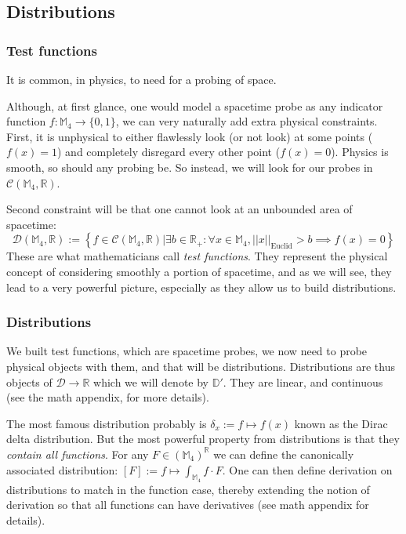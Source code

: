 \documentclass[a4paper,11pt]{article}
\numberwithin{equation}{section}
\theoremstyle{definition}
\begin{document}
\subsection{Distributions}\label{DistribPhy}
\subsubsection{Test functions}
    It is common, in physics, to need for a probing of space.
    
    Although, at first glance, one would model a spacetime probe as any indicator function $f:\mathbb{M}_4 \to \{0,1\}$, we can very naturally add extra physical constraints. First, it is unphysical to either flawlessly look (or not look) at some points ($f(x)=1$) and completely disregard every other point ($f(x)=0$). Physics is smooth, so should any probing be. So instead, we will look for our probes in $\mathcal{C}(\mathbb{M}_4,\mathbb{R})$.

    Second constraint will be that one cannot look at an unbounded area of spacetime:
    $$\mathcal{D}(\mathbb{M}_4,\mathbb{R}):=\left\{f\in \mathcal{C}(\mathbb{M}_4,\mathbb{R})\big| \exists b \in \mathbb{R}_+ :\forall x \in \mathbb{M}_4, ||x||_\mathrm{Euclid}>b \implies f(x)=0\right\}$$
    These are what mathematicians call \emph{test functions}. They represent the physical concept of considering smoothly a portion of spacetime, and as we will see, they lead to a very powerful picture, especially as they allow us to build distributions.

\subsubsection{Distributions}
    We built test functions, which are spacetime probes, we now need to probe physical objects with them, and that will be distributions. Distributions are thus objects of $\mathcal{D}\to\mathbb{R}$ which we will denote by $\mathbb{D}'$. They are linear, and continuous (see the math appendix, for more details).

    The most famous distribution probably is $\delta_x:= f \mapsto f(x)$ known as the Dirac delta  distribution. 
    But the most powerful property from distributions is that they \emph{contain all functions}. For any $F\in (\mathbb{M}_4)^\mathbb{R}$ we can define the canonically associated distribution: $[F]:=f\mapsto\int_{\mathbb{M}_4} f\cdot F$. One can then define derivation on distributions to match in the function case, thereby extending the notion of derivation so that all functions can have derivatives (see math appendix for details).
\end{document}
